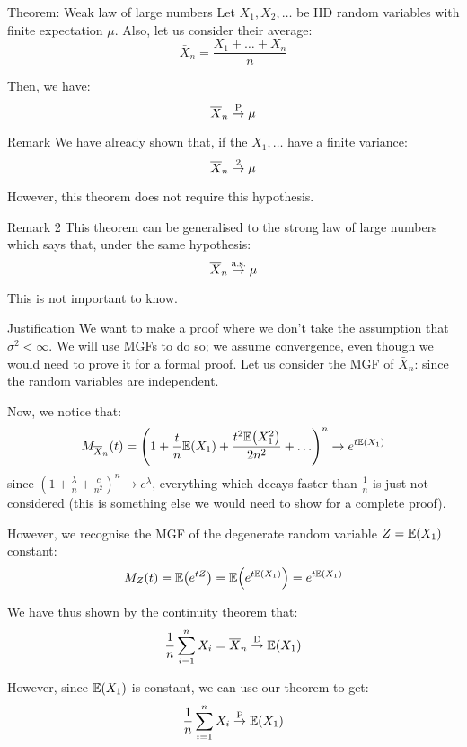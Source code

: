 \documentclass[a4paper]{article}
\begin{document}
\begin{parag}{Theorem: Weak law of large numbers}
    Let $X_1, X_2, \ldots$ be IID random variables with finite expectation $\mu$. Also, let us consider their average: 
    \[\bar{X}_n = \frac{X_1 + \ldots + X_n}{n}\]
    
    Then, we have: 
    \[\bar{X}_n \over{\to}{P} \mu\]
    
    \begin{subparag}{Remark}
        We have already shown that, if the $X_1, \ldots$ have a finite variance: 
        \[\bar{X}_n \over{\to}{2} \mu\]
        
        However, this theorem does not require this hypothesis.
    \end{subparag}

    \begin{subparag}{Remark 2}
        This theorem can be generalised to the strong law of large numbers which says that, under the same hypothesis:
        \[\bar{X}_n \over{\to}{a.s.} \mu\]

        This is not important to know.
    \end{subparag}

    \begin{subparag}{Justification}
        We want to make a proof where we don't take the assumption that $\sigma^2 < \infty$. We will use MGFs to do so; we assume convergence, even though we would need to prove it for a formal proof. Let us consider the MGF of $\bar{X}_n$: 
        since the random variables are independent.

        Now, we notice that: 
        \[M_{\bar{X}_n}\left(t\right) = \left(1 + \frac{t}{n} \exval\left(X_1\right) + \frac{t^2 \exval\left(X_1^2\right)}{2n^2} + \ldots\right)^n \to e^{t \exval\left(X_1\right)}\]
        since $\left(1  + \frac{\lambda}{n} + \frac{c}{n^2}\right)^n \to e^{\lambda}$, everything which decays faster than $\frac{1}{n}$ is just not considered (this is something else we would need to show for a complete proof).
        
        However, we recognise the MGF of the degenerate random variable $Z = \exval\left(X_1\right)$ constant: 
        \[M_Z\left(t\right) = \exval\left(e^{tZ}\right) = \exval\left(e^{t \exval\left(X_1\right)}\right) = e^{t\exval\left(X_1\right)}\]
        
        We have thus shown by the continuity theorem that: 
        \[\frac{1}{n} \sum_{i=1}^{n} X_i = \bar{X}_n \over{\to}{D} \exval\left(X_1\right)\]
        
        However, since $\exval\left(X_1\right)$ is constant, we can use our theorem to get: 
        \[\frac{1}{n} \sum_{i=1}^{n} X_i \over{\to}{P} \exval\left(X_1\right)\]
    \end{subparag}
\end{parag}
\end{document}

